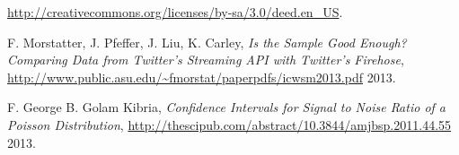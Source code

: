 \documentclass{article}
\begin{document}
\noindent \url{http://creativecommons.org/licenses/by-sa/3.0/deed.en_US}.


\begin{thebibliography}{2013}

 F. Morstatter, J. Pfeffer, J. Liu, K. Carley, \textsl{Is the Sample Good Enough? Comparing Data from Twitter’s Streaming API with Twitter’s Firehose}, \url{http://www.public.asu.edu/~fmorstat/paperpdfs/icwsm2013.pdf} 2013.

 F. George B. Golam Kibria, \textsl{Confidence Intervals for Signal to Noise Ratio of
a Poisson Distribution}, \url{http://thescipub.com/abstract/10.3844/amjbsp.2011.44.55} 2013.

\end{thebibliography}
\end{document}
